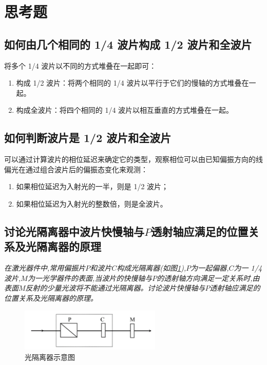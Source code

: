 \documentclass[UTF8]{ctexart}
\begin{document}
\newpage
\section{思考题}

\subsection{如何由几个相同的 1/4 波片构成 1/2 波片和全波片}

将多个 1/4 波片以不同的方式堆叠在一起即可：

\begin{enumerate}
    \item 构成 1/2 波片：将两个相同的 1/4 波片以平行于它们的慢轴的方式堆叠在一起。
    \item 构成全波片：将四个相同的 1/4 波片以相互垂直的方式堆叠在一起。
\end{enumerate}

\subsection{如何判断波片是 1/2 波片和全波片}

可以通过计算波片的相位延迟来确定它的类型，观察相位可以由已知偏振方向的线偏光在通过组合波片后的偏振态变化来观测：

\begin{enumerate}
    \item 如果相位延迟为入射光的一半，则是 1/2 波片；
    \item 如果相位延迟为入射光的整数倍，则是全波片。
\end{enumerate}

\subsection{讨论光隔离器中波片快慢轴与$P$透射轴应满足的位置关系及光隔离器的原理}

\emph{在激光器件中,常用偏振片$P$和波片$C$构成光隔离器(如图\ref{fig:optical_isolator}),$P$为一起偏器,$C$为一 1/4 波片,$M$为一光学器件的表面,当波片的快慢轴与$P$的透射轴方向满足一定关系时,由表面$M$反射的少量光波将不能通过光隔离器。讨论波片快慢轴与$P$透射轴应满足的位置关系及光隔离器的原理。}

\begin{figure}[h]
    \centering
    \includegraphics[width=0.6\textwidth]{img/optical_isolator.png}
    \caption{光隔离器示意图}
    \label{fig:optical_isolator}
\end{figure}
\end{document}
